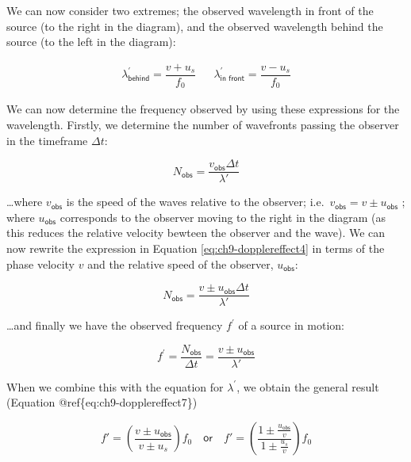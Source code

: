 \documentclass[
]{book}
\begin{document}
We can now consider two extremes; the observed wavelength in front of the source (to the right in the diagram), and the observed wavelength behind the source (to the left in the diagram):

\begin{equation}
\begin{array}{rcl}
\lambda^\prime_{\textsf{behind}} = \dfrac{v+u_{s}}{f_{0}} && \lambda^\prime_{\textsf{in front}} = \dfrac{v-u_{s}}{f_{0}}
\end{array}
\label{eq:ch9-dopplereffect3}
\end{equation}

We can now determine the frequency observed by using these expressions for the wavelength. Firstly, we determine the number of wavefronts passing the observer in the timeframe \(\Delta t\):

\begin{equation}
N_{\textsf{obs}} = \frac{v_{\textsf{obs}}\Delta t}{\lambda'}
\label{eq:ch9-dopplereffect4}
\end{equation}

\ldots where \(v_{\textsf{obs}}\) is the speed of the waves relative to the observer; i.e.~\(v_{\textsf{obs}} = v \pm u_{\textsf{obs}}\) ; where \(u_{\textsf{obs}}\) corresponds to the observer moving to the right in the diagram (as this reduces the relative velocity bewteen the observer and the wave). We can now rewrite the expression in Equation \eqref{eq:ch9-dopplereffect4} in terms of the phase velocity \(v\) and the relative speed of the observer, \(u_{\textsf{obs}}\):

\begin{equation}
N_{\textsf{obs}} = \frac{v \pm u_{\textsf{obs}}\Delta t}{\lambda'}
\label{eq:ch9-dopplereffect5}
\end{equation}

\ldots and finally we have the observed frequency \(f^\prime\) of a source in motion:

\begin{equation}
f^\prime = \frac{N_{\textsf{obs}}}{\Delta t} = \frac{v\pm u_{\textsf{obs}}}{\lambda'}
\label{eq:ch9-dopplereffect6}
\end{equation}

When we combine this with the equation for \(\lambda^\prime\), we obtain the general result (Equation @ref\{eq:ch9-dopplereffect7\})

\begin{equation}
f' = \left(\frac{v\pm u_{\textsf{obs}}}{v\pm u_{s}}\right)f_{0}\quad\textsf{or}\quad f' = \left(\frac{1\pm \frac{u_{\textsf{obs}}}{v}}{1\pm \frac{u_{s}}{v}}\right)f_{0}
\label{eq:ch9-dopplereffect7}
\end{equation}
\end{document}
